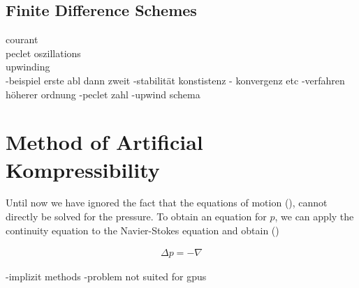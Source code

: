 \subsection{Finite Difference Schemes}
courant\\
peclet oszillations\\
upwinding\\
-beispiel erste abl dann zweit
-stabilität konstistenz - konvergenz etc
-verfahren höherer ordnung
-peclet zahl
-upwind schema

\newpage

\section{Method of Artificial Kompressibility}

Until now we have ignored the fact that the equations of motion (), cannot directly be solved for the pressure.
To obtain an equation for $p$, we can apply the continuity equation to the Navier-Stokes equation and obtain (\cite{ferziger99})

\begin{align}
    \Delta p =  -\nabla
\end{align}

-implizit methods
-problem not suited for gpus


